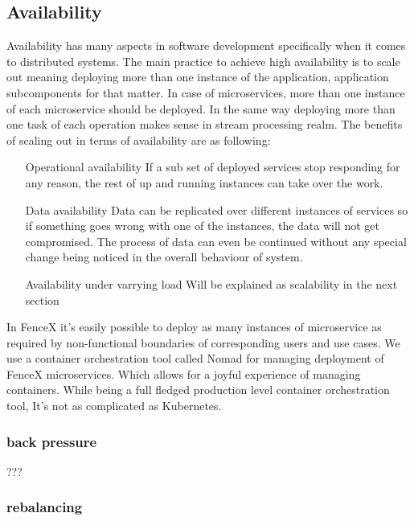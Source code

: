 \documentclass[a4]{report}
\begin{document}
    \subsection{Availability}
    Availability has many aspects in software development specifically when it comes to distributed systems.
    The main practice to achieve high availability is to scale out meaning deploying more than one instance of the
    application, application subcomponents for that matter.
    In case of microservices, more than one instance of each microservice should be deployed.
    In the same way deploying more than one task of each operation makes sense in stream processing realm.
    The benefits of scaling out in terms of availability are as following:
    \begin{itemize}
        \item[Operational availability] If a sub set of deployed services stop responding for any reason, the rest of
        up and running instances
        can take over the work.
        \item[Data availability] Data can be replicated over different instances of services so if something goes
        wrong with one of the instances, the data will not get compromised.
        The process of data can even be continued without any special change being noticed in the overall behaviour of
        system.
        \item[Availability under varrying load] Will be explained as scalability in the next section
    \end{itemize}

    In FenceX it's easily possible to deploy as many instances of microservice as required by non-functional boundaries
    of corresponding users and use cases.
    We use a container orchestration tool called Nomad for managing deployment of FenceX microservices.
    Which allows for a joyful experience of managing containers.
    While being a full fledged production level container orchestration tool, It's not as complicated as Kubernetes.

    \subsubsection{back pressure}
    ???

    \subsubsection{rebalancing}
\end{document}
